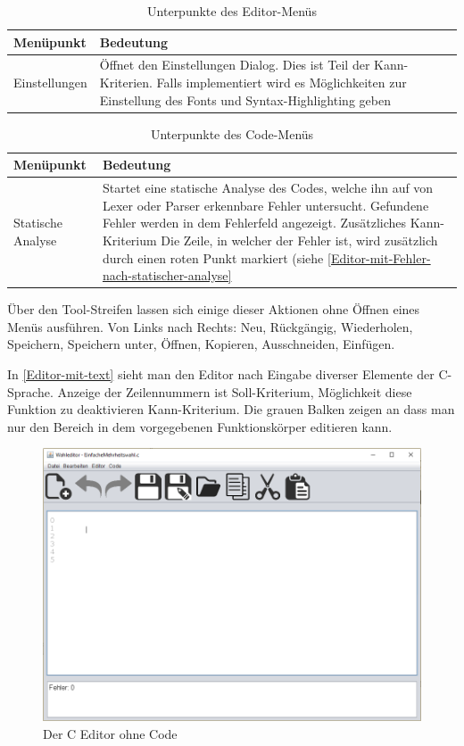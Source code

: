 \documentclass[a4paper]{scrreprt}
\begin{document}
\begin{table}[H]
\begin{tabular}{|p{3cm}|p{12cm}|}
Menüpunkt & Bedeutung \\
\hline
Einstellungen & Öffnet den Einstellungen Dialog. Dies ist Teil der Kann-Kriterien. Falls implementiert wird es Möglichkeiten zur Einstellung des Fonts und Syntax-Highlighting geben 
\end{tabular}
\label{Editor-Menüpunkte}
\caption{Unterpunkte des Editor-Menüs}
\end{table}

\begin{table}[H]
\begin{tabular}{|p{3cm}|p{12cm}|}
Menüpunkt & Bedeutung \\
\hline
Statische Analyse & Startet eine statische Analyse des Codes, welche ihn auf von Lexer oder Parser erkennbare Fehler untersucht. Gefundene Fehler werden in dem Fehlerfeld angezeigt. Zusätzliches Kann-Kriterium Die Zeile, in welcher der Fehler ist, wird zusätzlich durch einen roten Punkt markiert (siehe \ref{Editor-mit-Fehler-nach-statischer-analyse}
\end{tabular}
\label{Editor-Menüpunkte}
\caption{Unterpunkte des Code-Menüs}
\end{table}

Über den Tool-Streifen lassen sich einige dieser Aktionen ohne Öffnen eines Menüs ausführen. Von Links nach Rechts: Neu, Rückgängig, Wiederholen, Speichern, Speichern unter, Öffnen, Kopieren, Ausschneiden, Einfügen.

In \ref{Editor-mit-text} sieht man den Editor nach Eingabe diverser Elemente der C-Sprache. Anzeige der Zeilennummern ist Soll-Kriterium, Möglichkeit diese Funktion zu deaktivieren Kann-Kriterium. Die grauen Balken zeigen an dass man nur den Bereich in dem vorgegebenen Funktionskörper editieren kann.

\begin{figure}[H]
\includegraphics[scale=0.5]{Editor-ohne-text.png}
\caption{Der C Editor ohne Code}
\end{figure}
\end{document}
